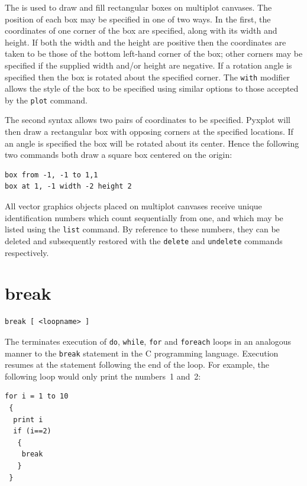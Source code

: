 The  is used to draw and fill rectangular boxes on multiplot
canvases.  The position of each box may be specified in one of two ways.  In the
first, the coordinates of one corner of the box are specified, along with its
width and height. If both the width and the height are positive then the
coordinates are taken to be those of the bottom left-hand corner of the box;
other corners may be specified if the supplied width and/or height are
negative. If a rotation angle is specified then the box is rotated about the
specified corner.  The {\tt with} modifier allows the style of the box to be
specified using similar options to those accepted by the {\tt plot} command.

The second syntax allows two pairs of coordinates to be specified.  Pyxplot
will then draw a rectangular box with opposing corners at the specified
locations.  If an angle is specified the box will be rotated about its center.
Hence the following two commands both draw a square box centered on the origin:

\begin{verbatim}
box from -1, -1 to 1,1
box at 1, -1 width -2 height 2
\end{verbatim}

All vector graphics objects placed on multiplot canvases receive unique
identification numbers which count sequentially from one, and which may be
listed using the {\tt list} command.  By reference to these numbers, they can
be deleted and subsequently restored with the {\tt delete} and {\tt undelete}
commands respectively.


\section{break}

\begin{verbatim}
break [ <loopname> ]
\end{verbatim}

The  terminates execution of {\tt do}, {\tt while}, {\tt for}
and {\tt foreach} loops in an analogous manner to the {\tt break} statement in
the C programming language.  Execution resumes at the statement following the
end of the loop. For example, the following loop would only print the numbers~1
and~2:

\begin{verbatim}
for i = 1 to 10
 {
  print i
  if (i==2)
   {
    break
   }
 }
\end{verbatim}

